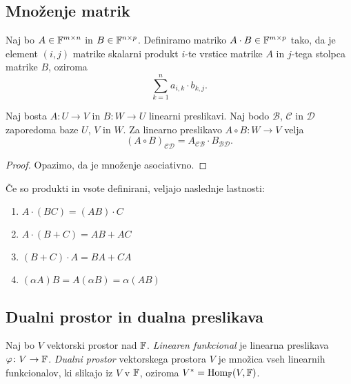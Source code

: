 \documentclass[12pt, a4paper]{article}
\begin{document}
\newpage

\subsection{Množenje matrik}

\begin{okvir}
\begin{definicija}
Naj bo $A\in\mathbb{F}^{m\times n}$ in $B\in\mathbb{F}^{n\times p}$. Definiramo matriko $A\cdot B\in\mathbb{F}^{m\times p}$ tako, da je element $(i,j)$ matrike skalarni produkt $i$-te vrstice matrike $A$ in $j$-tega stolpca matrike $B$, oziroma
\[
\sum_{k=1}^n a_{i,k}\cdot b_{k,j}.
\]
\end{definicija}
\end{okvir}

\begin{izrek}
Naj bosta $A\colon U\to V$ in $B\colon W\to U$ linearni preslikavi. Naj bodo $\mathcal{B}$, $\mathcal{C}$ in $\mathcal{D}$ zaporedoma baze $U$, $V$ in $W$. Za linearno preslikavo $A\circ B\colon W\to V$ velja
\[
(A\circ B)_{\mathcal{CD}}=A_{\mathcal{CB}}\cdot B_{\mathcal{BD}}.
\]
\end{izrek}

\begin{proof}
Opazimo, da je množenje asociativno.
\end{proof}

\begin{posledica}
Če so produkti in vsote definirani, veljajo naslednje lastnosti:

\begin{enumerate}
\item $A\cdot(BC)=(AB)\cdot C$
\item $A\cdot(B+C)=AB+AC$
\item $(B+C)\cdot A=BA+CA$
\item $(\alpha A)B=A(\alpha B)=\alpha(AB)$
\end{enumerate}
\end{posledica}

\newpage

\subsection{Dualni prostor in dualna preslikava}

\begin{okvir}
\begin{definicija}
Naj bo $V$ vektorski prostor nad $\mathbb{F}$. \emph{Linearen funkcional} je linearna preslikava $\varphi\colon V\to\mathbb{F}$. \emph{Dualni prostor} vektorskega prostora $V$ je množica vseh linearnih funkcionalov, ki slikajo iz $V$ v $\mathbb{F}$, oziroma $V^*=\operatorname{Hom}_{\mathbb{F}}(V,\mathbb{F})$.
\end{definicija}
\end{okvir}
\end{document}

